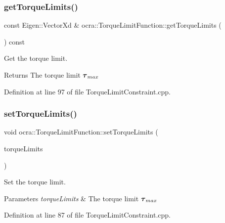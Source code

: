 \subsubsection{\texorpdfstring{get\+Torque\+Limits()}{getTorqueLimits()}}
{\footnotesize\ttfamily const Eigen\+::\+Vector\+Xd \& ocra\+::\+Torque\+Limit\+Function\+::get\+Torque\+Limits (\begin{DoxyParamCaption}{ }\end{DoxyParamCaption}) const}

Get the torque limit.

\begin{DoxyReturn}{Returns}
The torque limit $ \mbox{\boldmath${\tau}$}_{max} $ 
\end{DoxyReturn}


Definition at line 97 of file Torque\+Limit\+Constraint.\+cpp.

\hypertarget{classocra_1_1TorqueLimitFunction_a038250b745913584724401ea719177a5}{}\label{classocra_1_1TorqueLimitFunction_a038250b745913584724401ea719177a5} 
\subsubsection{\texorpdfstring{set\+Torque\+Limits()}{setTorqueLimits()}}
{\footnotesize\ttfamily void ocra\+::\+Torque\+Limit\+Function\+::set\+Torque\+Limits (\begin{DoxyParamCaption}\item[{const Eigen\+::\+Vector\+Xd \&}]{torque\+Limits }\end{DoxyParamCaption})}

Set the torque limit.


\begin{DoxyParams}{Parameters}
{\em torque\+Limits} & The torque limit $ \mbox{\boldmath${\tau}$}_{max} $ \\
\hline
\end{DoxyParams}


Definition at line 87 of file Torque\+Limit\+Constraint.\+cpp.

\hypertarget{classocra_1_1TorqueLimitFunction_a157cb13ffdc53d3a7ed568b59154b0d0}{}\label{classocra_1_1TorqueLimitFunction_a157cb13ffdc53d3a7ed568b59154b0d0} 
